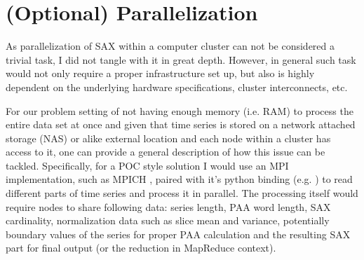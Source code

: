 \documentclass{article}
\begin{document}
\section{(Optional) Parallelization}
As parallelization of SAX within a computer cluster can not be considered a trivial task, I did not tangle with it in great depth. However, in general such task would not only require a proper infrastructure set up, but also is highly dependent on the underlying hardware specifications, cluster interconnects, etc. \par
For our problem setting of not having enough memory (i.e. RAM) to process the entire data set at once and given that time series is stored on a network attached storage (NAS) or alike external location and each node within a cluster has access to it, one can provide a general description of how this issue can be tackled. Specifically, for a POC style solution I would use an MPI implementation, such as MPICH \cite{mpich}, paired with it's python binding (e.g. \cite{dalcin2011parallel}) to read different parts of time series and process it in parallel. The processing itself would require nodes to share following data: series length, PAA word length, SAX cardinality, normalization data such as slice mean and variance, potentially boundary values of the series for proper PAA calculation and the resulting SAX part for final output (or the reduction in MapReduce context).
\end{document}
